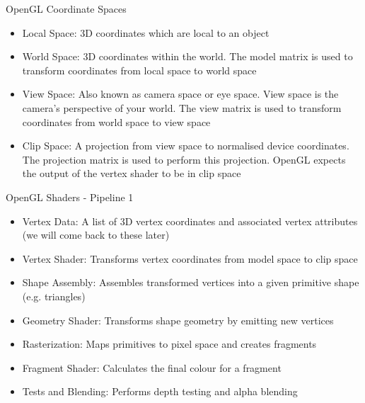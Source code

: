 \documentclass{beamer}
\begin{document}
\begin{frame}{OpenGL Coordinate Spaces}
    \begin{itemize}
        \item Local Space: 3D coordinates which are local to an object
        \item World Space: 3D coordinates within the world. The model matrix is used to transform coordinates from local space to world space
        \item View Space: Also known as camera space or eye space. View space is the camera's perspective of your world. The view matrix is used to transform coordinates from world space to view space
        \item Clip Space: A projection from view space to normalised device coordinates. The projection matrix is used to perform this projection. OpenGL expects the output of the vertex shader to be in clip space
    \end{itemize}
\end{frame}

\begin{frame}{OpenGL Shaders - Pipeline 1}
    \begin{itemize}
        \item Vertex Data: A list of 3D vertex coordinates and associated vertex attributes (we will come back to these later)
        \item Vertex Shader: Transforms vertex coordinates from model space to clip space
        \item Shape Assembly: Assembles transformed vertices into a given primitive shape (e.g. triangles)
        \item Geometry Shader: Transforms shape geometry by emitting new vertices
        \item Rasterization: Maps primitives to pixel space and creates fragments
        \item Fragment Shader: Calculates the final colour for a fragment
        \item Tests and Blending: Performs depth testing and alpha blending
    \end{itemize}
\end{frame}
\end{document}
